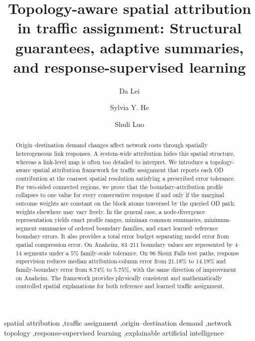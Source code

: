\documentclass[a4paper,fleqn]{cas-sc}
\begin{document}
\title[mode=title]{Topology-aware spatial attribution in traffic assignment: Structural guarantees, adaptive summaries, and response-supervised learning}
\author[1]{Da Lei}
\author[2]{Sylvia Y. He}
\cormark[1]
\author[3]{Shuli Luo}
\begin{abstract}
Origin--destination demand changes affect network costs through spatially heterogeneous link responses. A system-wide attribution hides this spatial structure, whereas a link-level map is often too detailed to interpret. We introduce a topology-aware spatial attribution framework for traffic assignment that reports each OD contribution at the coarsest spatial resolution satisfying a prescribed error tolerance. For two-sided connected regions, we prove that the boundary-attribution profile collapses to one value for every conservative response if and only if the marginal outcome weights are constant on the block atoms traversed by the queried OD path; weights elsewhere may vary freely. In the general case, a node-divergence representation yields exact profile ranges, minimax common summaries, minimum-segment summaries of ordered boundary families, and exact learned--reference boundary errors. It also provides a total error budget separating model error from spatial compression error. On Anaheim, 83--211 boundary values are represented by 4--14 segments under a $5\%$ family-scale tolerance. On 96 Sioux Falls test paths, response supervision reduces median attribution-column error from $21.18\%$ to $14.19\%$ and family-boundary error from $8.74\%$ to $5.75\%$, with the same direction of improvement on Anaheim. The framework provides physically consistent and mathematically controlled spatial explanations for both reference and learned traffic assignment.
\end{abstract}
\begin{keywords}
spatial attribution \sep traffic assignment \sep origin--destination demand \sep network topology \sep response-supervised learning \sep explainable artificial intelligence
\end{keywords}
\maketitle
{}
\end{document}
